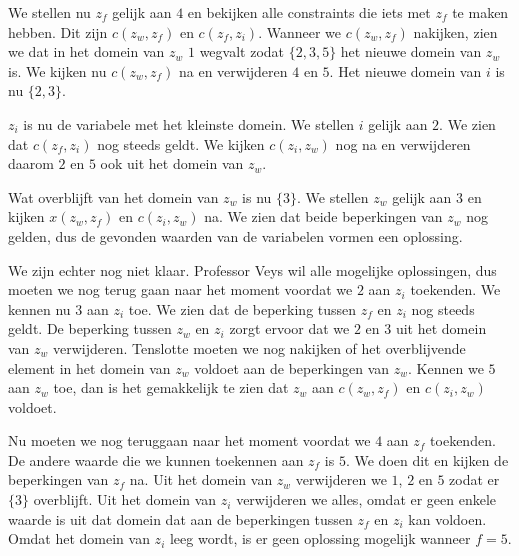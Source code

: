 \documentclass[alternative-exam.tex]{subfiles}
\begin{document}
We stellen nu $z_f$ gelijk aan $4$ en bekijken alle constraints die iets met $z_f$ te maken hebben. Dit zijn $c(z_w,z_f)$ en $c(z_f,z_i)$. Wanneer we $c(z_w,z_f)$ nakijken, zien we dat in het domein van $z_w$ $1$ wegvalt zodat $\{2,3,5\}$ het nieuwe domein van $z_w$ is. We kijken nu $c(z_w,z_f)$ na en verwijderen $4$ en $5$. Het nieuwe domein van $i$ is nu $\{2,3\}$.

$z_i$ is nu de variabele met het kleinste domein. We stellen $i$ gelijk aan $2$. We zien dat $c(z_f,z_i)$ nog steeds geldt. We kijken $c(z_i,z_w)$ nog na en verwijderen daarom $2$ en $5$ ook uit het domein van $z_w$.

Wat overblijft van het domein van $z_w$ is nu $\{3\}$. We stellen $z_w$ gelijk aan $3$ en kijken $x(z_w,z_f)$ en $c(z_i,z_w)$ na. We zien dat beide beperkingen van $z_w$ nog gelden, dus de gevonden waarden van de variabelen vormen een oplossing.

We zijn echter nog niet klaar. Professor Veys wil alle mogelijke oplossingen, dus moeten we nog terug gaan naar het moment voordat we $2$ aan $z_i$ toekenden. We kennen nu $3$ aan $z_i$ toe. We zien dat de beperking tussen $z_f$ en $z_i$ nog steeds geldt. De beperking tussen $z_w$ en $z_i$ zorgt ervoor dat we $2$ en $3$ uit het domein van $z_w$ verwijderen. Tenslotte moeten we nog nakijken of het overblijvende element in het domein van $z_w$ voldoet aan de beperkingen van $z_w$.
Kennen we $5$ aan $z_w$ toe, dan is het gemakkelijk te zien dat $z_w$ aan $c(z_w,z_f)$ en $c(z_i,z_w)$ voldoet.

Nu moeten we nog teruggaan naar het moment voordat we $4$ aan $z_f$ toekenden. De andere waarde die we kunnen toekennen aan $z_f$ is $5$. We doen dit en kijken de beperkingen van $z_f$ na. Uit het domein van $z_w$ verwijderen we $1$, $2$ en $5$ zodat er $\{3\}$ overblijft. Uit het domein van $z_i$ verwijderen we alles, omdat er geen enkele waarde is uit dat domein dat aan de beperkingen tussen $z_f$ en $z_i$ kan voldoen. Omdat het domein van $z_i$ leeg wordt, is er geen oplossing mogelijk wanneer $f=5$.
\end{document}
